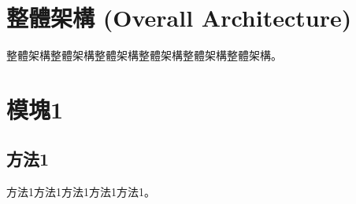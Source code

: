 
\section{整體架構 (Overall Architecture)}
整體架構整體架構整體架構整體架構整體架構整體架構。\par


\section{模塊1}
\subsection{方法1}
方法1方法1方法1方法1方法1。\par


